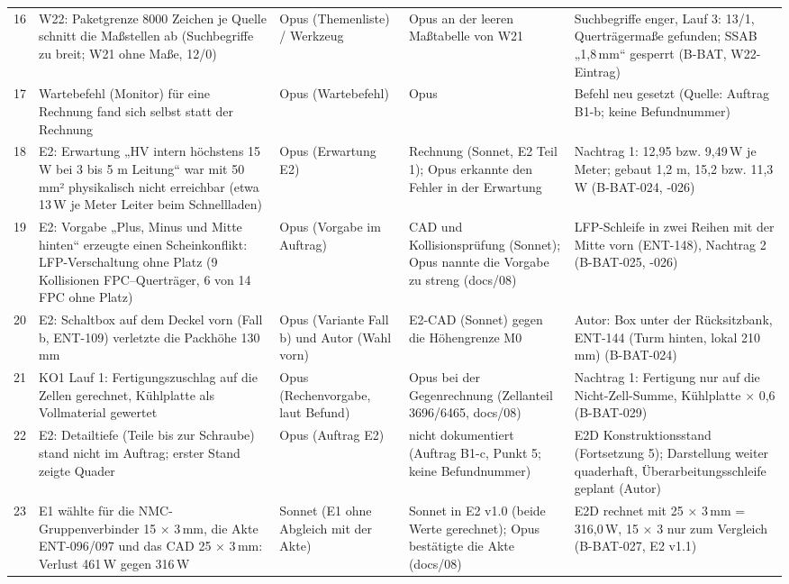 \documentclass[10pt,a4paper]{article}
\begin{document}
\begin{longtable}{@{}p{0.4cm}p{3.6cm}p{2.5cm}p{4.4cm}p{3.0cm}@{}}
16 & W22: Paketgrenze 8000 Zeichen je Quelle schnitt die Maßstellen ab (Suchbegriffe zu breit; W21 ohne Maße, 12/0) & Opus (Themenliste) / Werkzeug
 & Opus an der leeren Maßtabelle von W21 & Suchbegriffe enger, Lauf 3: 13/1, Querträgermaße gefunden; SSAB „1,8\,mm“ gesperrt (B-BAT, W22-Eintrag)\\
17 & Wartebefehl (Monitor) für eine Rechnung fand sich selbst statt der Rechnung & Opus (Wartebefehl)
 & Opus & Befehl neu gesetzt (Quelle: Auftrag B1-b; keine Befundnummer)\\\midrule
18 & E2: Erwartung „HV intern höchstens 15\,W bei 3 bis 5 m Leitung“ war mit 50\,mm² physikalisch nicht erreichbar (etwa 13\,W je Meter Leiter beim Schnellladen) & Opus (Erwartung E2)
 & Rechnung (Sonnet, E2 Teil 1); Opus erkannte den Fehler in der Erwartung & Nachtrag 1: 12,95 bzw. 9,49\,W je Meter; gebaut 1,2 m, 15,2 bzw. 11,3\,W (B-BAT-024, -026)\\
19 & E2: Vorgabe „Plus, Minus und Mitte hinten“ erzeugte einen Scheinkonflikt: LFP-Verschaltung ohne Platz (9 Kollisionen FPC--Querträger, 6 von 14 FPC ohne Platz) & Opus (Vorgabe im Auftrag)
 & CAD und Kollisionsprüfung (Sonnet); Opus nannte die Vorgabe zu streng (docs/08) & LFP-Schleife in zwei Reihen mit der Mitte vorn (ENT-148), Nachtrag 2 (B-BAT-025, -026)\\
20 & E2: Schaltbox auf dem Deckel vorn (Fall b, ENT-109) verletzte die Packhöhe 130\,mm & Opus (Variante Fall b) und Autor (Wahl vorn)
 & E2-CAD (Sonnet) gegen die Höhengrenze M0 & Autor: Box unter der Rücksitzbank, ENT-144 (Turm hinten, lokal 210\,mm) (B-BAT-024)\\
21 & KO1 Lauf 1: Fertigungszuschlag auf die Zellen gerechnet, Kühlplatte als Vollmaterial gewertet & Opus (Rechenvorgabe, laut Befund)
 & Opus bei der Gegenrechnung (Zellanteil 3696/6465, docs/08) & Nachtrag 1: Fertigung nur auf die Nicht-Zell-Summe, Kühlplatte $\times$ 0,6 (B-BAT-029)\\
22 & E2: Detailtiefe (Teile bis zur Schraube) stand nicht im Auftrag; erster Stand zeigte Quader & Opus (Auftrag E2)
 & nicht dokumentiert (Auftrag B1-c, Punkt 5; keine Befundnummer) & E2D Konstruktionsstand (Fortsetzung 5); Darstellung weiter quaderhaft, Überarbeitungsschleife geplant (Autor)\\
23 & E1 wählte für die NMC-Gruppenverbinder 15 × 3\,mm, die Akte ENT-096/097 und das CAD 25 × 3\,mm: Verlust 461\,W gegen 316\,W & Sonnet (E1 ohne Abgleich mit der Akte)
 & Sonnet in E2 v1.0 (beide Werte gerechnet); Opus bestätigte die Akte (docs/08) & E2D rechnet mit 25 × 3\,mm = 316,0\,W, 15 × 3 nur zum Vergleich (B-BAT-027, E2 v1.1)\\\midrule

\end{longtable}
\end{document}
